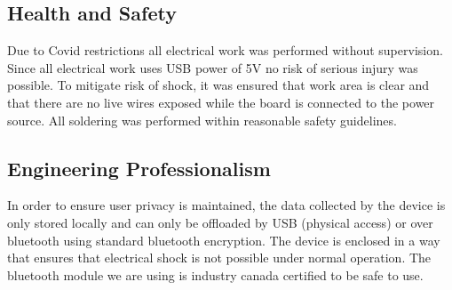 \subsection{Health and Safety}
Due to Covid restrictions all electrical work was performed without supervision.  
Since all electrical work uses USB power of 5V no risk of serious injury was possible.
To mitigate risk of shock, it was ensured that work area is clear and that there are no live wires exposed while the board is connected to the power source.
All soldering was performed within reasonable safety guidelines.

\subsection{Engineering Professionalism}
In order to ensure user privacy is maintained, the data collected by the device is only stored locally and
can only be offloaded by USB (physical access) or over bluetooth using standard bluetooth encryption.
The device is enclosed in a way that ensures that electrical shock is not possible under normal operation.
The bluetooth module we are using is industry canada certified to be safe to use.

